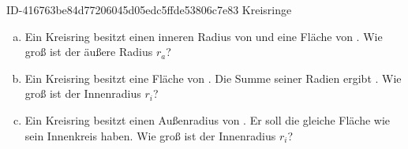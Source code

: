 \begin{exercise}
      {ID-416763be84d77206045d05edc5ffde53806c7e83}
      {Kreisringe}
  \ifproblem\problem
    \begin{enumerate}[a)]
      \item Ein Kreisring besitzt einen inneren Radius von  und eine
            Fläche von . Wie groß ist der äußere Radius $r_{a}$?
      \item Ein Kreisring besitzt eine Fläche von . Die Summe
            seiner Radien ergibt . Wie groß ist der Innenradius
            $r_{i}$?
      \item Ein Kreisring besitzt einen Außenradius von . Er soll
            die gleiche Fläche wie sein Innenkreis haben. Wie groß ist der
            Innenradius $r_{i}$?
    \end{enumerate}
  \fi
\end{exercise}
